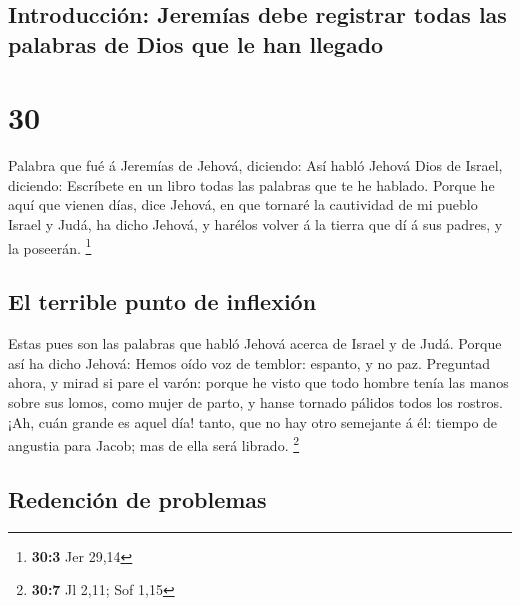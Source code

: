 \hypertarget{introducciuxf3n-jeremuxedas-debe-registrar-todas-las-palabras-de-dios-que-le-han-llegado}{%
\subsection{Introducción: Jeremías debe registrar todas las palabras de
Dios que le han
llegado}\label{introducciuxf3n-jeremuxedas-debe-registrar-todas-las-palabras-de-dios-que-le-han-llegado}}

\hypertarget{section-29}{%
\section{30}\label{section-29}}

 Palabra que fué á Jeremías de Jehová, diciendo:
 Así habló Jehová Dios de Israel, diciendo: Escríbete en un
libro todas las palabras que te he hablado.  Porque he aquí
que vienen días, dice Jehová, en que tornaré la cautividad de mi pueblo
Israel y Judá, ha dicho Jehová, y harélos volver á la tierra que dí á
sus padres, y la poseerán. \footnote{\textbf{30:3} Jer 29,14}

\hypertarget{el-terrible-punto-de-inflexiuxf3n}{%
\subsection{El terrible punto de
inflexión}\label{el-terrible-punto-de-inflexiuxf3n}}

 Estas pues son las palabras que habló Jehová acerca de
Israel y de Judá.  Porque así ha dicho Jehová: Hemos oído
voz de temblor: espanto, y no paz.  Preguntad ahora, y mirad
si pare el varón: porque he visto que todo hombre tenía las manos sobre
sus lomos, como mujer de parto, y hanse tornado pálidos todos los
rostros.  ¡Ah, cuán grande es aquel día! tanto, que no hay
otro semejante á él: tiempo de angustia para Jacob; mas de ella será
librado. \footnote{\textbf{30:7} Jl 2,11; Sof 1,15}

\hypertarget{redenciuxf3n-de-problemas}{%
\subsection{Redención de problemas}\label{redenciuxf3n-de-problemas}}

